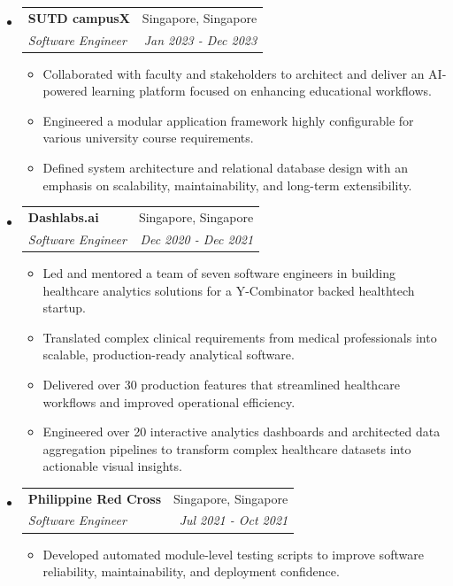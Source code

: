 \documentclass[letterpaper,11pt]{article}
\makeatletter
\newcommand{\resitem}[1]{\item #1 \vspace{-2pt}}
\newcommand{\ressubheading}[4]{
    \begin{tabular*}{6.5in}{p{4.8in}@{\extracolsep{\fill}}r}
            \textbf{#1} & #2 \\
            \textit{#3} & \textit{#4} \\
    \end{tabular*}\vspace{-8pt}}
\makeatother
\begin{document}
\begin{itemize}
        \begin{itemize}
            \resitem{Modernized a legacy Vue.js application by refactoring components into a modular, maintainable architecture to improve scalability.}
            \resitem{Redesigned a user-centric dashboard experience, enhancing usability and application navigation.}
            \resitem{Automated database integrity validation through scheduled monitoring scripts, reducing manual verification efforts and improving operational reliability.}
        \end{itemize}
        \item \ressubheading{SUTD campusX}{Singapore, Singapore}{Software Engineer}{Jan 2023 - Dec 2023}
        \begin{itemize}
            \resitem{Collaborated with faculty and stakeholders to architect and deliver an AI-powered learning platform focused on enhancing educational workflows.}
            \resitem{Engineered a modular application framework highly configurable for various university course requirements.}
            \resitem{Defined system architecture and relational database design with an emphasis on scalability, maintainability, and long-term extensibility.}
        \end{itemize}
        \item \ressubheading{Dashlabs.ai}{Singapore, Singapore}{Software Engineer}{Dec 2020 - Dec 2021}
        \begin{itemize}
            \resitem{Led and mentored a team of seven software engineers in building healthcare analytics solutions for a Y-Combinator backed healthtech startup.}
            \resitem{Translated complex clinical requirements from medical professionals into scalable, production-ready analytical software.}
            \resitem{Delivered over 30 production features that streamlined healthcare workflows and improved operational efficiency.}
            \resitem{Engineered over 20 interactive analytics dashboards and architected data aggregation pipelines to transform complex healthcare datasets into actionable visual insights.}
        \end{itemize}
        \item \ressubheading{Philippine Red Cross}{Singapore, Singapore}{Software Engineer}{Jul 2021 - Oct 2021}
        \begin{itemize}
            \resitem{Developed automated module-level testing scripts to improve software reliability, maintainability, and deployment confidence.}
        \end{itemize}

\end{itemize}
\end{document}
